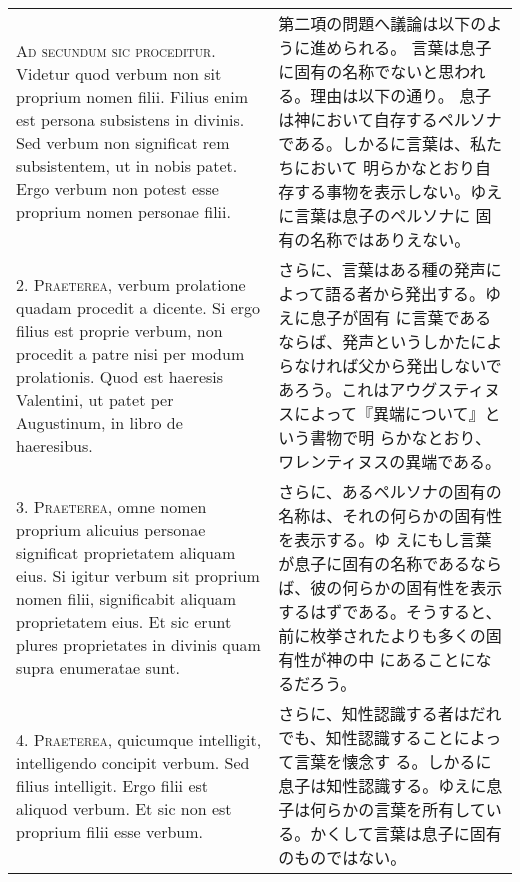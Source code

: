 \documentclass[10pt]{jsarticle} %
\begin{document}
\begin{longtable}{p{21em}p{21em}}
{\scshape Ad secundum sic proceditur}. Videtur quod verbum non sit proprium nomen
filii. Filius enim est persona subsistens in divinis. Sed verbum non
significat rem subsistentem, ut in nobis patet. Ergo verbum non potest
esse proprium nomen personae filii.

&

第二項の問題へ議論は以下のように進められる。
言葉は息子に固有の名称でないと思われる。理由は以下の通り。
息子は神において自存するペルソナである。しかるに言葉は、私たちにおいて
 明らかなとおり自存する事物を表示しない。ゆえに言葉は息子のペルソナに
 固有の名称ではありえない。


\\



2. {\scshape Praeterea}, verbum prolatione quadam procedit a dicente. Si ergo filius
est proprie verbum, non procedit a patre nisi per modum
prolationis. Quod est haeresis Valentini, ut patet per Augustinum, in
libro de haeresibus.

&

さらに、言葉はある種の発声によって語る者から発出する。ゆえに息子が固有
 に言葉であるならば、発声というしかたによらなければ父から発出しないで
 あろう。これはアウグスティヌスによって『異端について』という書物で明
 らかなとおり、ワレンティヌスの異端である。

\\



3. {\scshape Praeterea}, omne nomen proprium alicuius personae significat
proprietatem aliquam eius. Si igitur verbum sit proprium nomen filii,
significabit aliquam proprietatem eius. Et sic erunt plures
proprietates in divinis quam supra enumeratae sunt.

&

さらに、あるペルソナの固有の名称は、それの何らかの固有性を表示する。ゆ
 えにもし言葉が息子に固有の名称であるならば、彼の何らかの固有性を表示
 するはずである。そうすると、前に枚挙されたよりも多くの固有性が神の中
 にあることになるだろう。

\\



4. {\scshape Praeterea}, quicumque intelligit, intelligendo concipit verbum. Sed
filius intelligit. Ergo filii est aliquod verbum. Et sic non est
proprium filii esse verbum.

&

さらに、知性認識する者はだれでも、知性認識することによって言葉を懐念す
 る。しかるに息子は知性認識する。ゆえに息子は何らかの言葉を所有してい
 る。かくして言葉は息子に固有のものではない。


\end{longtable}
\end{document}
